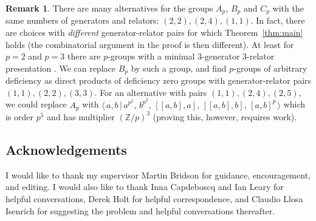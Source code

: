 \documentclass[a4paper,12pt]{amsart}
\theoremstyle{plain}
\theoremstyle{definition}
\newtheorem{rmk}[lem]{Remark}
\newcommand{\Z}{\mathbb{Z}}
\newcommand{\gp}[2]{\langle \, #1 \, | \, #2 \, \rangle}
\begin{document}
\begin{rmk}
    There are many alternatives for the groups $A_p$, $B_p$ and $C_p$ with the same numbers of generators and relators: $(2, 2), (2, 4), (1, 1)$.
    In fact, there are choices with \emph{different} generator-relator pairs for which Theorem~\ref{thm:main} holds (the combinatorial argument in the proof is then different).
    At least for $p=2$ and $p=3$ there are $p$-groups with a minimal 3-generator 3-relator presentation \cite[\S 4]{johnsonrobertson}.
    We can replace $B_p$ by such a group, and find $p$-groups of arbitrary deficiency as direct products of deficiency zero groups with generator-relator pairs $(1, 1), (2, 2), (3, 3)$.
    For an alternative with pairs $(1, 1), (2, 4), (2, 5)$, we could replace $A_p$ with \(
        \gp{a,b}{a^{p^2}, \,b^{p^2}, \,[[a,b], a], \,[[a,b], b], \,[a, b]^p}
    \) which is order $p^5$ and has multiplier $(\Z/p)^3$ (proving this, however, requires work).
\end{rmk}

\subsection*{Acknowledgements} I would like to thank my supervisor Martin Bridson for guidance, encouragement, and editing. I would also like to thank Inna Capdeboscq and Ian Leary for helpful conversations, Derek Holt for helpful correspondence, and Claudio Llosa Isenrich for suggesting the problem and helpful conversations thereafter.

\vspace{-3ex}
{}

\end{document}
